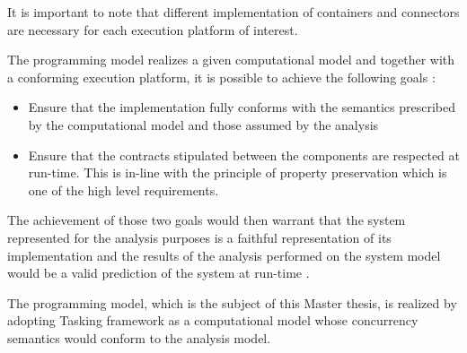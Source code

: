 It is important to note that different implementation of containers and connectors are necessary for each execution platform of interest.

The programming model realizes a given computational model and together with a conforming execution platform, it is possible to achieve the following goals \cite{PhdThesis}:

\begin{itemize}
\item Ensure that the implementation fully conforms with the semantics prescribed by the computational model and those assumed by the analysis
\item Ensure that the contracts stipulated between the components are respected at run-time. This is in-line with the principle of property preservation which is one of the high level requirements.
\end{itemize} 

The achievement of those two goals would then warrant that the system represented for the analysis purposes is a faithful representation of its implementation and the results of the analysis performed on the system model would be a valid prediction of the system at run-time \cite{PhdThesis}.

The programming model, which is the subject of this Master thesis, is realized by adopting Tasking framework as a computational model whose concurrency semantics would conform to the analysis model.     
